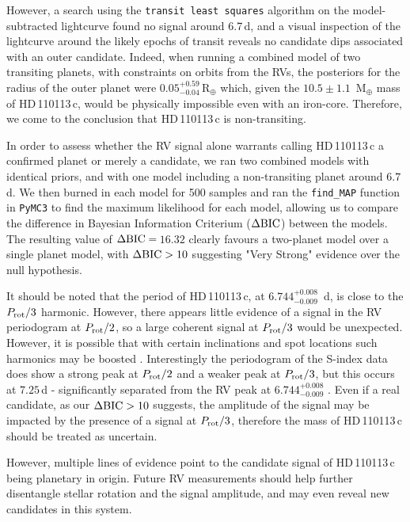 \documentclass[fleqn,usenatbib]{mnras}
\newcommand{\rearth}{R$_{\oplus}$}
\newcommand{\mearth}{M$_{\oplus}$}
\newcommand{\TPone}{ $ 6.744^{+0.008}_{-0.009} $ }
\newcommand{\TMpone}{ $ 10.5 \pm 1.1 $ }
\newcommand{\Tplanetc}{HD\,110113\,c}
\newcommand{\TdeltaBIC}{$16.32$}
\begin{document}
However, a search using the \texttt{transit least squares} algorithm \citep{hippke2019optimized} on the model-subtracted lightcurve found no signal around 6.7\,d, and a visual inspection of the lightcurve around the likely epochs of transit reveals no candidate dips associated with an outer candidate.
Indeed, when running a combined model of two transiting planets, with constraints on orbits from the RVs, the posteriors for the radius of the outer planet were $0.05^{+0.59}_{-0.04}$\,\rearth{} which, given the \TMpone{}\,\mearth{} mass of \Tplanetc{}, would be physically impossible even with an iron-core.
Therefore, we come to the conclusion that \Tplanetc{} is non-transiting.

In order to assess whether the RV signal alone warrants calling \Tplanetc{} a confirmed planet or merely a candidate, we ran two combined models with identical priors, and with one model including a non-transiting planet around $6.7$d.
We then burned in each model for 500 samples and ran the \texttt{find\_MAP} function in \texttt{PyMC3} to find the maximum likelihood for each model, allowing us to compare the difference in Bayesian Information Criterium ($\Delta{\rm BIC}$) between the models.
The resulting value of $\Delta{\rm BIC}= $\,\TdeltaBIC{} clearly favours a two-planet model over a single planet model, with $\Delta{\rm BIC}>10$ suggesting "Very Strong" evidence over the null hypothesis. 

It should be noted that the period of \Tplanetc{}, at \TPone{}\,d, is close to the $P_{\rm rot}/3$ harmonic.
However, there appears little evidence of a signal in the RV periodogram at $P_{\rm rot}/2$, so a large coherent signal at $P_{\rm rot}/3$ would be unexpected.
However, it is possible that with certain inclinations and spot locations such harmonics may be boosted \citep{vanderburg2016radial,boisse2011disentangling}.
Interestingly the periodogram of the S-index data does show a strong peak at $P_{\rm rot}/2$ and a weaker peak at $P_{\rm rot}/3$, but this occurs at $7.25$\,d - significantly separated from the RV peak at \TPone{}.
Even if a real candidate, as our $\Delta{\rm BIC}>10$ suggests, the amplitude of the signal may be impacted by the presence of a signal at $P_{\rm rot}/3$, therefore the mass of \Tplanetc{} should be treated as uncertain. 

However, multiple lines of evidence point to the candidate signal of \Tplanetc{} being planetary in origin.
Future RV measurements should help further disentangle stellar rotation and the signal amplitude, and may even reveal new candidates in this system.
\end{document}
